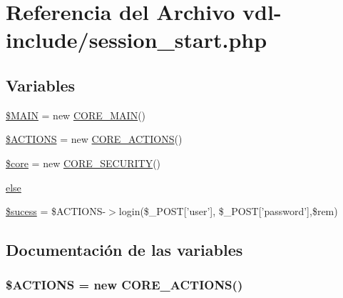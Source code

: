 \hypertarget{session__start_8php}{\section{Referencia del Archivo vdl-\/include/session\-\_\-start.php}
\label{session__start_8php}
}
\subsection*{Variables}
\begin{DoxyCompactItemize}
\item 
\hyperlink{session__start_8php_aa3efd4a61925b50d9d066bd2b42dcd3d}{\$\-M\-A\-I\-N} = new \hyperlink{classCORE__MAIN}{C\-O\-R\-E\-\_\-\-M\-A\-I\-N}()
\item 
\hyperlink{session__start_8php_afd09e7ecb266b5fb5bf6e9c716b64a40}{\$\-A\-C\-T\-I\-O\-N\-S} = new \hyperlink{classCORE__ACTIONS}{C\-O\-R\-E\-\_\-\-A\-C\-T\-I\-O\-N\-S}()
\item 
\hyperlink{session__start_8php_aa432de3bacb7ced3632fa0ee0269ada3}{\$core} = new \hyperlink{classCORE__SECURITY}{C\-O\-R\-E\-\_\-\-S\-E\-C\-U\-R\-I\-T\-Y}()
\item 
\hyperlink{session__start_8php_a0544c3fe466e421738dae463968b70ba}{else}
\item 
\hyperlink{session__start_8php_a86449a889635e869cc5aa1014aaf61fb}{\$sucess} = \$A\-C\-T\-I\-O\-N\-S-\/$>$login(\$\-\_\-\-P\-O\-S\-T\mbox{[}'user'\mbox{]}, \$\-\_\-\-P\-O\-S\-T\mbox{[}'password'\mbox{]},\$rem)
\end{DoxyCompactItemize}


\subsection{Documentación de las variables}
\hypertarget{session__start_8php_afd09e7ecb266b5fb5bf6e9c716b64a40}{
\subsubsection[{\$\-A\-C\-T\-I\-O\-N\-S}]{\setlength{\rightskip}{0pt plus 5cm}\$A\-C\-T\-I\-O\-N\-S = new {\bf C\-O\-R\-E\-\_\-\-A\-C\-T\-I\-O\-N\-S}()}}\label{session__start_8php_afd09e7ecb266b5fb5bf6e9c716b64a40}


